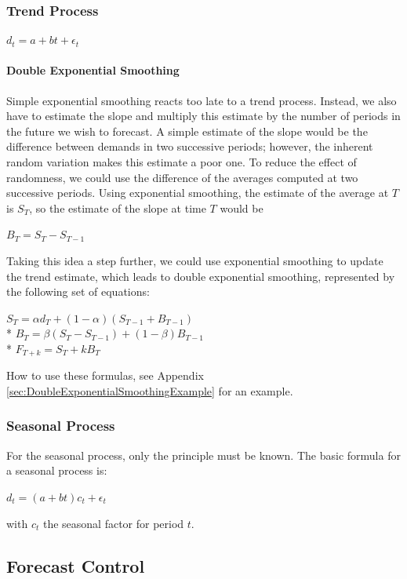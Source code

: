\documentclass[12pt]{article}
\begin{document}
\subsubsection{Trend Process}
\begin{center}
$d_t = a + bt + \epsilon_t$
\end{center}
\paragraph{Double Exponential Smoothing} Simple exponential smoothing reacts too late to a trend process. Instead, we also have to estimate the slope and multiply this estimate by the number of periods in the future we wish to forecast. A simple estimate of the slope would be the difference between demands in two successive periods; however, the inherent random variation makes this estimate a poor one. To reduce the effect of randomness, we could use the difference of the averages computed at two successive periods. Using exponential smoothing, the estimate of the average at $T$ is $S_T$, so the estimate of the slope at time $T$ would be
\begin{center}
$B_T = S_T - S_{T-1}$
\end{center}
Taking this idea a step further, we could use exponential smoothing to update the trend estimate, which leads to double exponential smoothing, represented by the following set of equations:
\begin{center}
$S_T = \alpha d_T + (1 - \alpha)(S_{T-1} + B_{T-1})$\\*
$B_T = \beta(S_T - S_{T-1}) + (1 - \beta)B_{T-1}$\\*
$F_{T+k} = S_T + kB_T$
\end{center}
How to use these formulas, see Appendix \ref{sec:DoubleExponentialSmoothingExample} for an example.
\subsubsection{Seasonal Process}
For the seasonal process, only the principle must be known. The basic formula for a seasonal process is:
\begin{center}
$d_t = (a + bt)c_t + \epsilon_t$
\end{center}
with $c_t$ the seasonal factor for period $t$.
\setcounter{subsection}{6}
\subsection{Forecast Control}
\end{document}
